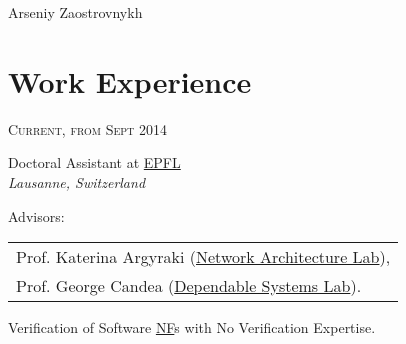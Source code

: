 \documentclass[10pt]{article} %
\begin{document}
\color{text1} %


\begin{flushright}
{\sffamily\Huge Arseniy Zaostrovnykh}\\ %
\end{flushright}
\vspace{-14pt}


\begin{minipage}[h]{0.5\textwidth} %
\vspace{0pt} %
	

\section{Work Experience} 


{\raggedleft\textsc{Current, from Sept 2014}\par}

{\raggedright\large Doctoral Assistant at \textsc{\href{http://phd.epfl.ch/edic}{EPFL}}\\
\textit{Lausanne, Switzerland}\\[4pt]}

\begin{normalsize}
Advisors: 
\begin{tabular}{l}
    Prof. Katerina Argyraki (\href{http://nal.epfl.ch}{Network Architecture Lab}),\\
    Prof. George Candea (\href{http://dslab.epfl.ch}{Dependable Systems Lab}).
\end{tabular}
Verification of Software \href{https://en.wikipedia.org/wiki/Network_function_virtualization}{NF}s with No Verification Expertise.\\
\end{normalsize}


\end{minipage}
\end{document}
